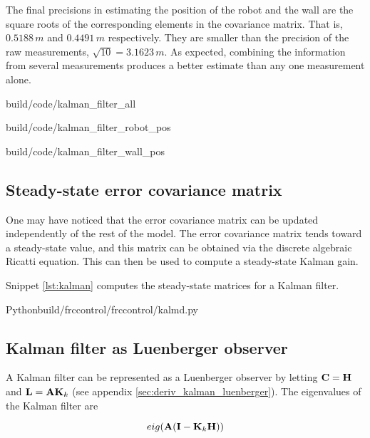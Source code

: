 The final precisions in estimating the position of the robot and the wall are
the square roots of the corresponding elements in the covariance matrix. That
is, $0.5188\,m$ and $0.4491\,m$ respectively. They are smaller than the
precision of the raw measurements, $\sqrt{10} = 3.1623\,m$. As expected,
combining the information from several measurements produces a better estimate
than any one measurement alone.

\begin{svg}{build/code/kalman_filter_all}
  \caption{State estimates and measurements with Kalman filter}
  \label{fig:filter_all}
\end{svg}

\begin{svg}{build/code/kalman_filter_robot_pos}
  \caption{Robot position estimate and variance with Kalman filter}
  \label{fig:filter_robot_pos}
\end{svg}

\begin{svg}{build/code/kalman_filter_wall_pos}
  \caption{Wall position estimate and variance with Kalman filter}
  \label{fig:filter_wall_pos}
\end{svg}

\subsection{Steady-state error covariance matrix}

One may have noticed that the error covariance matrix can be updated
independently of the rest of the \gls{model}. The error covariance matrix tends
toward a steady-state value, and this matrix can be obtained via the discrete
algebraic Ricatti equation. This can then be used to compute a steady-state
Kalman gain.

Snippet \ref{lst:kalman} computes the steady-state matrices for a Kalman
filter.

\begin{code}{Python}{build/frccontrol/frccontrol/kalmd.py}
  \caption{Steady-state Kalman gain and error covariance matrices calculation in
    Python}
  \label{lst:kalman}
\end{code}

\subsection{Kalman filter as Luenberger observer}

A Kalman filter can be represented as a Luenberger \gls{observer} by letting
$\mathbf{C} = \mathbf{H}$ and $\mathbf{L} = \mathbf{A} \mathbf{K}_k$ (see appendix
\ref{sec:deriv_kalman_luenberger}). The eigenvalues of the Kalman filter are

\begin{equation}
  eig(\mathbf{A}(\mathbf{I} - \mathbf{K}_k\mathbf{H}))
\end{equation}
